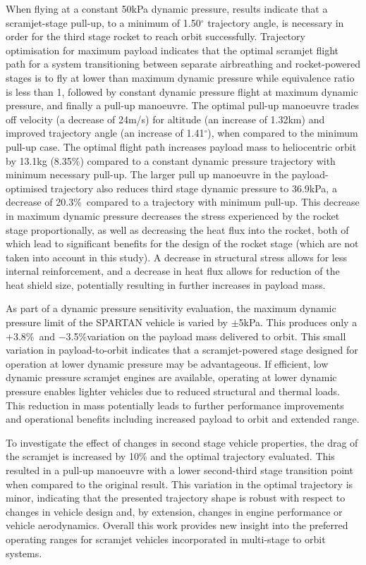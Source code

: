 \documentclass[journal]{new-aiaa}
\newcommand{\PayloadImprovement}{8.35\%}
\newcommand{\qDecrease}{20.3\%}
\newcommand{\qVariationPlus}{$+$3.8\%}
\newcommand{\qVariationMinus}{$-$3.5\%}
\newcommand{\SeparationAngleConstq}{1.50}
\newcommand{\SeparationqFiftykPa}{36.9}
\begin{document}
   When flying at a constant 50kPa dynamic pressure, results indicate that a scramjet-stage pull-up, to a minimum of \SeparationAngleConstq $^\circ$ trajectory angle, is necessary in order for the third stage rocket to reach orbit successfully. Trajectory optimisation for maximum payload indicates that the optimal scramjet flight path for a system transitioning between separate airbreathing and rocket-powered stages is to fly at lower than maximum dynamic pressure while equivalence ratio is less than 1, followed by constant dynamic pressure flight at maximum dynamic pressure, and finally a pull-up manoeuvre. The optimal pull-up manoeuvre trades off velocity (a decrease of 24m/s) for altitude (an increase of 1.32km) and improved trajectory angle (an increase of 1.41$^\circ$), when compared to the minimum pull-up case. The optimal flight path increases payload mass to heliocentric orbit by 13.1kg (\PayloadImprovement) compared to a constant dynamic pressure trajectory with minimum necessary pull-up. The larger pull up manoeuvre in the payload-optimised trajectory also reduces third stage dynamic pressure to \SeparationqFiftykPa kPa, a decrease of \qDecrease\ compared to a trajectory with minimum pull-up. This decrease in maximum dynamic pressure decreases the stress experienced by the rocket stage proportionally, as well as decreasing the heat flux into the rocket, both of which lead to significant benefits for the design of the rocket stage (which are not taken into account in this study). A decrease in structural stress allows for less internal reinforcement, and a decrease in heat flux allows for reduction of the heat shield size, potentially resulting in further increases in payload mass.
  

As part of a dynamic pressure sensitivity evaluation, the maximum dynamic pressure limit of the SPARTAN vehicle is varied by $\pm$5kPa. This produces only a \qVariationPlus\ and \qVariationMinus \space variation on the payload mass delivered to orbit. This small variation in payload-to-orbit indicates that a scramjet-powered stage designed for operation at lower dynamic pressure may be advantageous.
If efficient, low dynamic pressure scramjet engines are available, operating at lower dynamic pressure enables lighter vehicles due to reduced structural and thermal loads. This reduction in mass potentially leads to further performance improvements and operational benefits including increased payload to orbit and extended range.
 
 To investigate the effect of changes in second stage vehicle properties, the drag of the scramjet is increased by 10\% and the optimal trajectory evaluated. This resulted in a pull-up manoeuvre with a lower second-third stage transition point when compared to the original result. This variation in the optimal trajectory is minor, indicating that the presented trajectory shape is robust with respect to changes in vehicle design and, by extension, changes in engine performance or vehicle aerodynamics. Overall this work provides new insight into the preferred operating ranges for scramjet vehicles incorporated in multi-stage to orbit systems.
\end{document}
